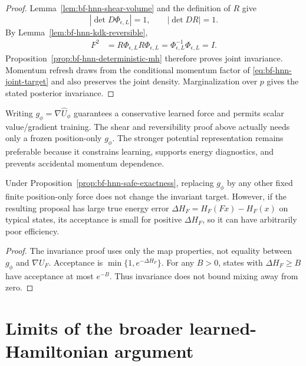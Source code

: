 \begin{proof}
Lemma~\ref{lem:bf-hnn-shear-volume} and the definition of $R$ give
\begin{equation}
 |\det D\Phi_{\epsilon,L}|=1,
 \qquad
 |\det DR|=1.
\end{equation}
By Lemma~\ref{lem:bf-hnn-kdk-reversible},
\begin{align}
 F^2
 &=R\Phi_{\epsilon,L}R\Phi_{\epsilon,L}
 =\Phi_{\epsilon,L}^{-1}\Phi_{\epsilon,L}=I.
\end{align}
Proposition~\ref{prop:bf-hnn-deterministic-mh} therefore proves joint
invariance.  Momentum refresh draws from the conditional momentum factor of
\eqref{eq:bf-hnn-joint-target} and also preserves the joint density.
Marginalization over $p$ gives the stated posterior invariance.
\end{proof}

\begin{remark}
Writing $g_\phi=\nabla\widehat U_\phi$ guarantees a conservative learned force
and permits scalar value/gradient training.  The shear and reversibility proof
above actually needs only a frozen position-only $g_\phi$.  The stronger
potential representation remains preferable because it constrains learning,
supports energy diagnostics, and prevents accidental momentum dependence.
\end{remark}

\begin{proposition}
\label{prop:bf-hnn-error-efficiency}
Under Proposition~\ref{prop:bf-hnn-safe-exactness}, replacing $g_\phi$ by any
other fixed finite position-only force does not change the invariant target.
However, if the resulting proposal has large true energy error
$\Delta H_F=H_F(Fx)-H_F(x)$ on typical states, its acceptance is small for
positive $\Delta H_F$, so it can have arbitrarily poor efficiency.
\end{proposition}

\begin{proof}
The invariance proof uses only the map properties, not equality between
$g_\phi$ and $\nabla U_F$.  Acceptance is
$\min\{1,e^{-\Delta H_F}\}$.  For any $B>0$, states with
$\Delta H_F\ge B$ have acceptance at most $e^{-B}$.  Thus invariance does not
bound mixing away from zero.
\end{proof}

\section{Limits of the broader learned-Hamiltonian argument}
\label{sec:bf-hnn-paper-audit}


